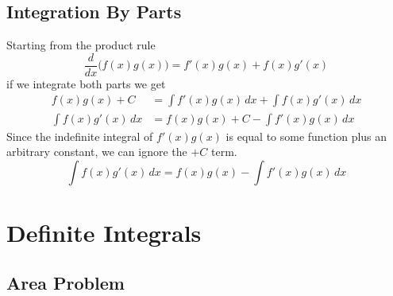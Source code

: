\documentclass[a4paper]{article}
\begin{document}
\subsection{Integration By Parts}

Starting from the product rule
\[
    \frac{d}{dx}\big(f(x)g(x)\big)=f'(x)g(x)+f(x)g'(x)
\]
if we integrate both parts we get
\begin{align*}
    f(x)g(x)+C&=\int f'(x)g(x)\,dx+\int f(x)g'(x)\,dx \\
    \int f(x)g'(x)\,dx &= f(x)g(x)+C - \int f'(x)g(x)\,dx 
\end{align*}
Since the indefinite integral of \(f'(x)g(x)\) is equal to some function plus an arbitrary constant, we can ignore the \(+C\) term.
\[
    \int f(x)g'(x)\,dx = f(x)g(x) - \int f'(x)g(x)\,dx
\]

\pagebreak

\section{Definite Integrals}

\subsection{Area Problem}
\end{document}
